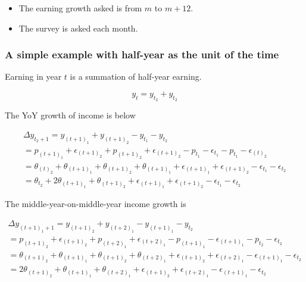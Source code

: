 \documentclass[12pt,notitlepage,onecolumn,aps,pra]{revtex4-1}
\providecommand{\tightlist}{%
      \setlength{\itemsep}{0pt}\setlength{\parskip}{0pt}}
\begin{document}
\begin{itemize}
\tightlist
\item
  The earning growth asked is from \(m\) to \(m+12\).
\item
  The survey is asked each month.
\end{itemize}

    \hypertarget{a-simple-example-with-half-year-as-the-unit-of-the-time}{%
\subsubsection{A simple example with half-year as the unit of the
time}\label{a-simple-example-with-half-year-as-the-unit-of-the-time}}

Earning in year \(t\) is a summation of half-year earning.

\begin{equation}
y_t = y_{t_2}+ y_{t_2} 
\end{equation}

The YoY growth of income is below

\begin{equation}
\begin{split}
\Delta y_{t_2+1} = y_{(t+1)_1}+ y_{(t+1)_2} - y_{t_1 } - y_{t_2}  \\
 = p_{(t+1)_1} + \epsilon_{(t+1)_2} + p_{(t+1)_2} + \epsilon_{(t+1)_2} - p_{t_1} - \epsilon_{t_1} - p_{t_1} - \epsilon_{(t)_2 } \\
 = \theta_{(t)_2} + \theta_{(t+1)_1} + \theta_{(t+1)_2} + \theta_{(t+1)_1} + \epsilon_{(t+1)_1} + \epsilon_{(t+1)_2} - \epsilon_{t_1} - \epsilon_{t_2} \\
 =  \theta_{t_2} + 2\theta_{(t+1)_1} + \theta_{(t+1)_2} + \epsilon_{(t+1)_1} + \epsilon_{(t+1)_2} - \epsilon_{t_1} - \epsilon_{t_2} 
\end{split}
\end{equation}

The middle-year-on-middle-year income growth is

\begin{equation}
\begin{split}
\Delta y_{(t+1)_1+1} = y_{(t+1)_2}+ y_{(t+2)_1} - y_{(t+1)_1} - y_{t_2}  \\
 = p_{(t+1)_2} + \epsilon_{(t+1)_2} + p_{(t+2)_1} + \epsilon_{(t+2)_1} - p_{(t+1)_1} - \epsilon_{(t+1)_1} - p_{t_2} - \epsilon_{t_2 } \\
 = \theta_{(t+1)_2} + \theta_{(t+1)_1} + \theta_{(t+1)_2} + \theta_{(t+2)_1} + \epsilon_{(t+1)_2} + \epsilon_{(t+2)_1} - \epsilon_{(t+1)_1} - \epsilon_{t_2 } \\
 = 2\theta_{(t+1)_2} + \theta_{(t+1)_1} + \theta_{(t+2)_1} + \epsilon_{(t+1)_2} + \epsilon_{(t+2)_1} - \epsilon_{(t+1)_1} - \epsilon_{t_2 }
\end{split}
\end{equation}
\end{document}
